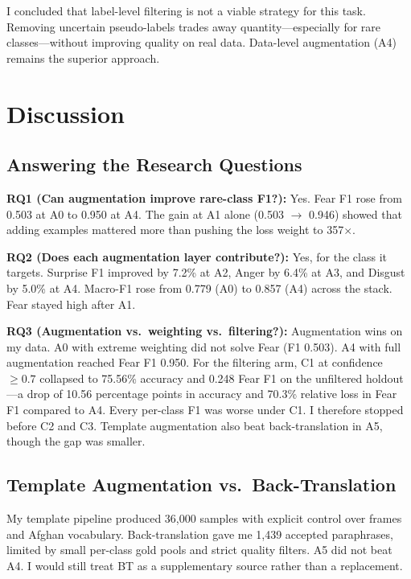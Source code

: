 \documentclass[11pt,a4paper]{article}
\begin{document}
I concluded that label-level filtering is not a viable strategy for this task. Removing uncertain pseudo-labels trades away quantity---especially for rare classes---without improving quality on real data. Data-level augmentation (A4) remains the superior approach.

\section{Discussion}
\label{sec:discussion}

\subsection{Answering the Research Questions}

\textbf{RQ1 (Can augmentation improve rare-class F1?):} Yes. Fear F1 rose from 0.503 at A0 to 0.950 at A4. The gain at A1 alone (0.503 $\rightarrow$ 0.946) showed that adding examples mattered more than pushing the loss weight to 357$\times$.

\textbf{RQ2 (Does each augmentation layer contribute?):} Yes, for the class it targets. Surprise F1 improved by 7.2\% at A2, Anger by 6.4\% at A3, and Disgust by 5.0\% at A4. Macro-F1 rose from 0.779 (A0) to 0.857 (A4) across the stack. Fear stayed high after A1.

\textbf{RQ3 (Augmentation vs.\ weighting vs.\ filtering?):} Augmentation wins on my data. A0 with extreme weighting did not solve Fear (F1 0.503). A4 with full augmentation reached Fear F1 0.950. For the filtering arm, C1 at confidence $\geq 0.7$ collapsed to 75.56\% accuracy and 0.248 Fear F1 on the unfiltered holdout---a drop of 10.56 percentage points in accuracy and 70.3\% relative loss in Fear F1 compared to A4. Every per-class F1 was worse under C1. I therefore stopped before C2 and C3. Template augmentation also beat back-translation in A5, though the gap was smaller.

\subsection{Template Augmentation vs.\ Back-Translation}

My template pipeline produced 36,000 samples with explicit control over frames and Afghan vocabulary. Back-translation gave me 1,439 accepted paraphrases, limited by small per-class gold pools and strict quality filters. A5 did not beat A4. I would still treat BT as a supplementary source rather than a replacement.
\end{document}
